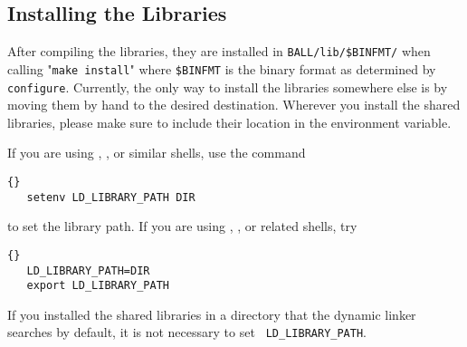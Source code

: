 \subsection{Installing the Libraries}

After compiling the libraries, they are installed in {\tt BALL/lib/\${BINFMT}/}
when calling "{\tt make install}" where {\tt \${BINFMT}} is the binary format
as determined by {\tt configure}.  Currently, the only way to install the
libraries somewhere else is by moving them by hand to the desired destination.
Wherever you install the shared libraries, please make sure to include their
location in the  environment variable.

If you are using , , or similar shells, use the command
\begin{lstlisting}{}
   setenv LD_LIBRARY_PATH DIR
\end{lstlisting}

\noindent to set the library path. If you are using , ,
or related shells, try

\begin{lstlisting}{}   
   LD_LIBRARY_PATH=DIR
   export LD_LIBRARY_PATH
\end{lstlisting}

If you installed the shared libraries in a directory that the dynamic linker
 searches by default, it is not necessary to set {\tt
LD\_LIBRARY\_PATH}.
